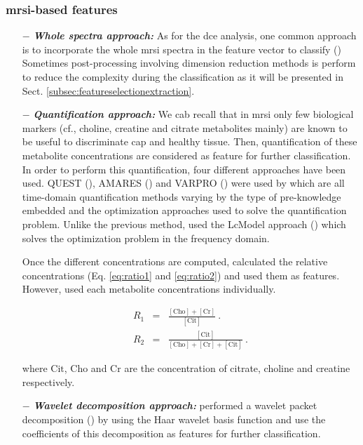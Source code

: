 \subsubsection{\ac{mrsi}-based features}

\begin{enumerate}[leftmargin=*]

\item[$-$] \textbf{\textit{Whole spectra approach:}} As for the \ac{dce} analysis, one common approach is to incorporate the whole \ac{mrsi} spectra in the feature vector to classify (\cite{Kelm2007,Parfait2012,Tiwari2007,Tiwari2009,Tiwari2013,Tiwari2009a,Tiwari2010,Viswanath2008a,Matulewicz2013}) Sometimes post-processing involving dimension reduction methods is perform to reduce the complexity during the classification as it will be presented in Sect. \ref{subsec:featureselectionextraction}.

\item[$-$] \textbf{\textit{Quantification approach:}} We cab recall that in \ac{mrsi} only few biological markers (cf., choline, creatine and citrate metabolites mainly) are known to be useful to discriminate \ac{cap} and healthy tissue. Then, quantification of these metabolite concentrations are considered as feature for further classification. In order to perform this quantification, four different approaches have been used. QUEST (\cite{Ratiney2005}), AMARES (\cite{Vanhamme1997}) and VARPRO (\cite{Coleman1993}) were used by \cite{Kelm2007} which are all time-domain quantification methods varying by the type of pre-knowledge embedded and the optimization approaches used to solve the quantification problem. Unlike the previous method, \cite{Parfait2012} used the LcModel approach (\cite{Provencher1993}) which solves the optimization problem in the frequency domain.

Once the different concentrations are computed, \cite{Kelm2007} calculated the relative concentrations (Eq. \ref{eq:ratio1} and \ref{eq:ratio2}) and used them as features. However, \cite{Parfait2012} used each metabolite concentrations individually.

\begin{eqnarray}
	R_1 & = & \frac{ [ \text{Cho} ] + [ \text{Cr} ]}{[ \text{Cit} ]} \ . \label{eq:ratio1} \\
	R_2 & = & \frac{[ \text{Cit} ]}{[\text{Cho}]+[\text{Cr}]+[\text{Cit}]} \ . \label{eq:ratio2}
\end{eqnarray}

\noindent where $\text{Cit}$, $\text{Cho}$ and $\text{Cr}$ are the concentration of citrate, choline and creatine respectively.

\item[$-$] \textbf{\textit{Wavelet decomposition approach:}} \cite{Tiwari2012} performed a wavelet packet decomposition (\cite{Coifman1992}) by using the Haar wavelet basis function and use the coefficients of this decomposition as features for further classification.

\end{enumerate}